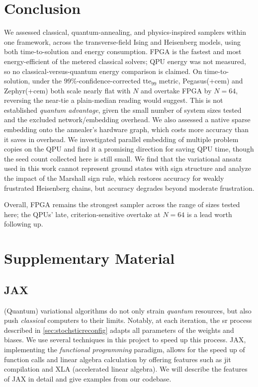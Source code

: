 \documentclass[10pt,a4paper]{article}
\numberwithin{equation}{section}
\begin{document}
\section{Conclusion}
We assessed classical, quantum-annealing, and physics-inspired samplers within one framework, across the transverse-field Ising and Heisenberg models, using both time-to-solution and energy consumption. FPGA is the fastest and most energy-efficient of the metered classical solvers; QPU energy was not measured, so no classical-versus-quantum energy comparison is claimed. On time-to-solution, under the $99\%$-confidence-corrected \gls{tte}$_{99}$ metric, Pegasus(+\gls{cem}) and Zephyr(+\gls{cem}) both scale nearly flat with $N$ and overtake FPGA by $N=64$, reversing the near-tie a plain-median reading would suggest. This is not established \textit{quantum advantage}, given the small number of system sizes tested and the excluded network/embedding overhead. We also assessed a native sparse embedding onto the annealer's hardware graph, which costs more accuracy than it saves in overhead. We investigated parallel embedding of multiple problem copies on the QPU and find it a promising direction for saving QPU time, though the seed count collected here is still small. We find that the variational ansatz used in this work cannot represent ground states with sign structure and analyze the impact of the Marshall sign rule, which restores accuracy for weakly frustrated Heisenberg chains, but accuracy degrades beyond moderate frustration.

Overall, FPGA remains the strongest sampler across the range of sizes tested here; the QPUs' late, criterion-sensitive overtake at $N=64$ is a lead worth following up.
\clearpage
\appendix
\section{Supplementary Material}
\subsection{JAX}
\label{sec:jax}
(Quantum) variational algorithms do not only strain \textit{quantum} resources, but also push \textit{classical} computers to their limits. Notably, at each iteration, the \gls{sr} process described in \autoref{sec:stochsticreconfig} adapts all parameters of the weights and biases. We use several techniques in this project to speed up this process. JAX, implementing the \textit{functional programming} paradigm, allows for the speed up of function calls and linear algebra calculation by offering features such as \gls{jit} compilation and XLA (accelerated linear algebra). We will describe the features of JAX in detail and give examples from our codebase.
\end{document}
